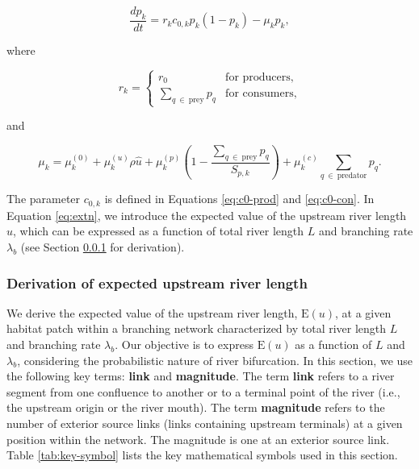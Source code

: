 \documentclass[11pt, class=article, crop=false]{standalone}
\begin{document}
\begin{equation}
    \frac{dp_k}{dt} = r_{k} c_{0, k} p_{k} (1 - p_{k}) - \mu_{k} p_{k},
    \label{eq:master}
\end{equation}

where

\begin{equation}
    r_{k} = 
    \begin{cases}
        r_0 & \text{for producers,}\\
        \sum_{q~\in~\text{prey}} p_{q} & \text{for consumers,}
    \end{cases}
\end{equation}

and

\begin{equation}
    \mu_{k} = 
        \mu_{k}^{(0)} + 
        \mu_{k}^{(u)} \rho \hat{u} + 
        \mu_{k}^{(p)} \left(1 - \frac{\sum_{q~\in~\text{prey}} p_{q}}{S_{p, k}} \right) + 
        \mu_{k}^{(c)} \sum_{q~\in~\text{predator}} p_{q}.
    \label{eq:extn}    
\end{equation}

The parameter $c_{0, k}$ is defined in Equations \ref{eq:c0-prod} and \ref{eq:c0-con}. 
In Equation \ref{eq:extn}, we introduce the expected value of the upstream river length $\hat{u}$, which can be expressed as a function of total river length $L$ and branching rate $\lambda_b$ (see Section \ref{updist} for derivation).

\subsubsection{Derivation of expected upstream river length} \label{updist}

We derive the expected value of the upstream river length, $\mbox{E}(u)$, at a given habitat patch within a branching network characterized by total river length $L$ and branching rate $\lambda_b$.
Our objective is to express $\mbox{E}(u)$ as a function of $L$ and $\lambda_b$, considering the probabilistic nature of river bifurcation.
In this section, we use the following key terms: \textbf{link} and \textbf{magnitude}.
The term \textbf{link} refers to a river segment from one confluence to another or to a terminal point of the river (i.e., the upstream origin or the river mouth).
The term \textbf{magnitude} refers to the number of exterior source links (links containing upstream terminals) at a given position within the network. The magnitude is one at an exterior source link.
Table \ref{tab:key-symbol} lists the key mathematical symbols used in this section.
\end{document}
